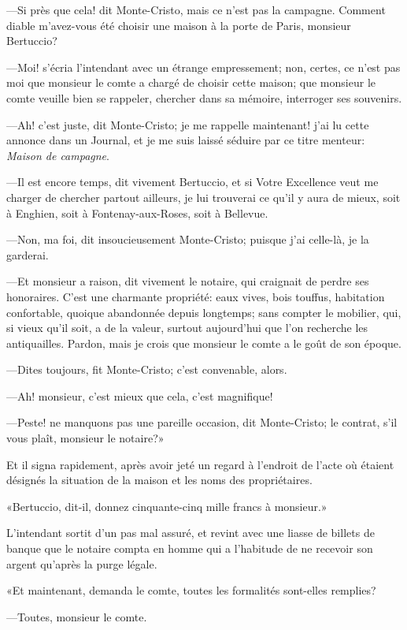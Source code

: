 —Si près que cela! dit Monte-Cristo, mais ce n'est pas la campagne. Comment diable m'avez-vous été choisir une maison à la porte de Paris, monsieur Bertuccio? 

—Moi! s'écria l'intendant avec un étrange empressement; non, certes, ce n'est pas moi que monsieur le comte a chargé de choisir cette maison; que monsieur le comte veuille bien se rappeler, chercher dans sa mémoire, interroger ses souvenirs. 

—Ah! c'est juste, dit Monte-Cristo; je me rappelle maintenant! j'ai lu cette annonce dans un Journal, et je me suis laissé séduire par ce titre menteur: \textit{Maison de campagne}. 

—Il est encore temps, dit vivement Bertuccio, et si Votre Excellence veut me charger de chercher partout ailleurs, je lui trouverai ce qu'il y aura de mieux, soit à Enghien, soit à Fontenay-aux-Roses, soit à Bellevue. 

—Non, ma foi, dit insoucieusement Monte-Cristo; puisque j'ai celle-là, je la garderai. 

—Et monsieur a raison, dit vivement le notaire, qui craignait de perdre ses honoraires. C'est une charmante propriété: eaux vives, bois touffus, habitation confortable, quoique abandonnée depuis longtemps; sans compter le mobilier, qui, si vieux qu'il soit, a de la valeur, surtout aujourd'hui que l'on recherche les antiquailles. Pardon, mais je crois que monsieur le comte a le goût de son époque.  

—Dites toujours, fit Monte-Cristo; c'est convenable, alors. 

—Ah! monsieur, c'est mieux que cela, c'est magnifique! 

—Peste! ne manquons pas une pareille occasion, dit Monte-Cristo; le contrat, s'il vous plaît, monsieur le notaire?» 

Et il signa rapidement, après avoir jeté un regard à l'endroit de l'acte où étaient désignés la situation de la maison et les noms des propriétaires. 

«Bertuccio, dit-il, donnez cinquante-cinq mille francs à monsieur.» 

L'intendant sortit d'un pas mal assuré, et revint avec une liasse de billets de banque que le notaire compta en homme qui a l'habitude de ne recevoir son argent qu'après la purge légale. 

«Et maintenant, demanda le comte, toutes les formalités sont-elles remplies? 

—Toutes, monsieur le comte. 


